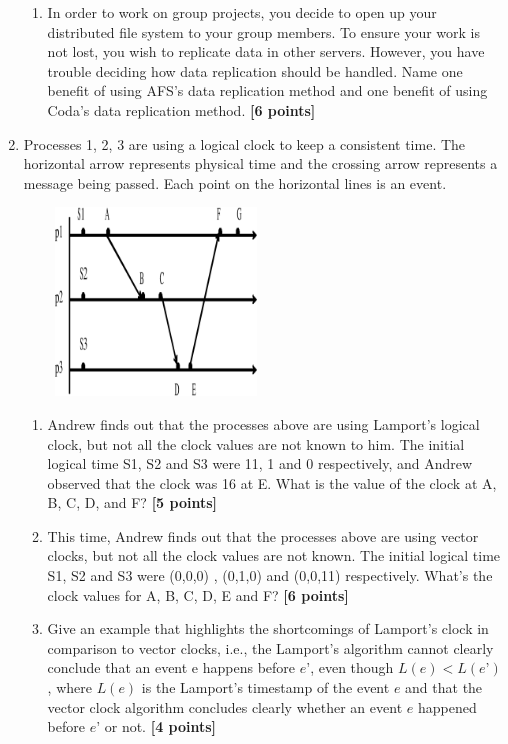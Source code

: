 \documentclass{article}
\begin{document}
\begin{enumerate}
\begin{enumerate}
    \item In order to work on group projects, you decide to open up your distributed file system to your group members. To ensure your work is not lost, you wish to replicate data in other servers. However, you have trouble deciding how data replication should be handled. Name one benefit of using AFS’s data replication method and one benefit of using Coda’s data replication method. \textbf{[6 points]}
    \end{enumerate}

\newpage
\item Processes 1, 2, 3 are using a logical clock to keep a consistent time. The horizontal arrow represents physical time and the crossing arrow represents a message being passed. Each point on the horizontal lines is an event.


\begin{center}
\includegraphics[height=5cm, width=7cm] {lo_logical_clock.eps}
\end{center}


    \begin{enumerate}

    \item Andrew finds out that the processes above are using Lamport's logical clock, but not all the clock values are not known to him. The initial logical time S1, S2 and S3 were 11, 1 and 0 respectively, and Andrew observed that the clock was 16 at E. What is the value of the clock at A, B, C, D, and F? \textbf{[5 points]}
    \item This time, Andrew finds out that the processes above are using vector clocks, but not all the clock values are not known. The initial logical time S1, S2 and S3 were (0,0,0) , (0,1,0) and (0,0,11) respectively. What's the clock values for A, B, C, D, E and F? \textbf{[6 points]}
    \item Give an example that highlights the shortcomings of Lamport’s clock in comparison to vector clocks, i.e., the Lamport’s algorithm cannot clearly conclude that an event e happens before $e’$, even though $L(e) < L(e’)$, where $L(e)$ is the Lamport’s timestamp of the event $e$ and that the vector clock algorithm concludes clearly whether an event $e$ happened before $e’$ or not. \textbf{[4 points]}
    

\end{enumerate}
\end{enumerate}
\end{document}
